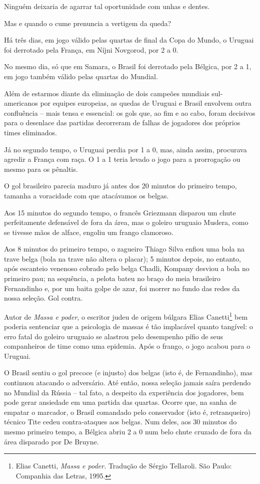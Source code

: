 Ninguém deixaria de agarrar tal oportunidade com unhas e dentes.

Mas e quando o cume prenuncia a vertigem da queda?

Há três dias, em jogo válido pelas quartas de final da Copa do Mundo, o
Uruguai foi derrotado pela França, em Níjni Novgorod, por 2 a 0.

No mesmo dia, só que em Samara, o Brasil foi derrotado pela Bélgica, por
2 a 1, em jogo também válido pelas quartas do Mundial.

Além de estarmos diante da eliminação de dois campeões mundiais
sul-americanos por equipes europeias, as quedas de Uruguai e Brasil
envolvem outra confluência -- mais tensa e essencial: os gols que, ao
fim e ao cabo, foram decisivos para o desenlace das partidas decorreram
de falhas de jogadores dos próprios times eliminados.

Já no segundo tempo, o Uruguai perdia por 1 a 0, mas, ainda assim,
procurava agredir a França com raça. O 1 a 1 teria levado o jogo para a
prorrogação ou mesmo para os pênaltis.

O gol brasileiro parecia maduro já antes dos 20 minutos do primeiro
tempo, tamanha a voracidade com que atacávamos os belgas.

Aos 15 minutos do segundo tempo, o francês Griezmann disparou um chute
perfeitamente defensável de fora da área, mas o goleiro uruguaio
Muslera, como se tivesse mãos de alface, engoliu um frango clamoroso.

Aos 8 minutos do primeiro tempo, o zagueiro Thiago Silva enfiou uma bola
na trave belga (bola na trave não altera o placar); 5 minutos depois, no
entanto, após escanteio venenoso cobrado pelo belga Chadli, Kompany
desviou a bola no primeiro pau; na sequência, a pelota bateu no braço do
meia brasileiro Fernandinho e, por um baita golpe de azar, foi morrer no
fundo das redes da nossa seleção. Gol contra.

Autor de \emph{Massa e poder}, o escritor judeu de origem búlgara Elias
Canetti\footnote{Elias Canetti, \emph{Massa e poder.} Tradução de Sérgio
  Tellaroli. São Paulo: Companhia das Letras, 1995.} bem poderia
sentenciar que a psicologia de massas é tão implacável quanto tangível:
o erro fatal do goleiro uruguaio se alastrou pelo desempenho pífio de
seus companheiros de time como uma epidemia. Após o frango, o jogo
acabou para o Uruguai.

O Brasil sentiu o gol precoce (e injusto) dos belgas (isto é, de
Fernandinho), mas continuou atacando o adversário. Até então, nossa
seleção jamais saíra perdendo no Mundial da Rússia -- tal fato, a
despeito da experiência dos jogadores, bem pode gerar ansiedade em uma
partida das quartas. Ocorre que, na sanha de empatar o marcador, o
Brasil comandado pelo conservador (isto é, retranqueiro) técnico Tite
cedeu contra-ataques aos belgas. Num deles, aos 30 minutos do mesmo
primeiro tempo, a Bélgica abriu 2 a 0 num belo chute cruzado de fora da
área disparado por De Bruyne.

